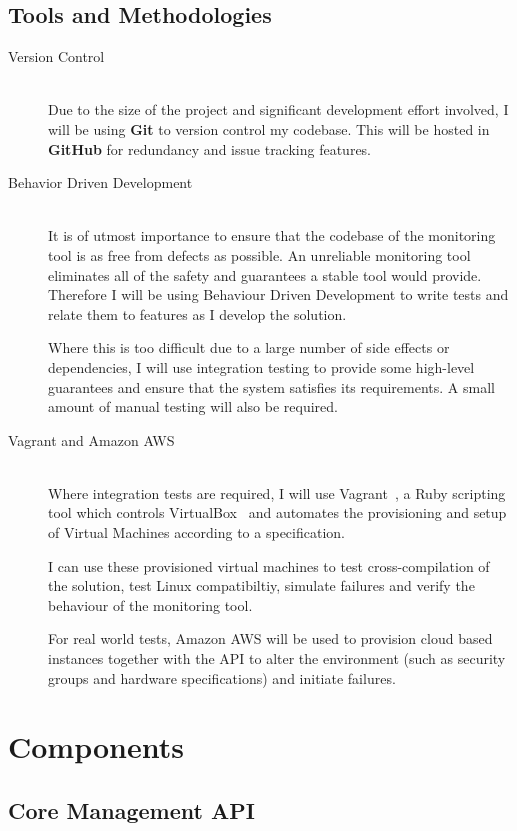 \documentclass{cshonours}
\begin{document}
\pagebreak
\subsection{Tools and Methodologies}
\begin{description}
  \item [Version Control]\hfill \\
    Due to the size of the project and significant development effort involved, I will be using \textbf{Git} to version control my codebase. This will be hosted in \textbf{GitHub} for redundancy and issue tracking features.
  \item [Behavior Driven Development]\hfill \\
    It is of utmost importance to ensure that the codebase of the monitoring tool is as free from defects as possible. An unreliable monitoring tool eliminates all of the safety and guarantees a stable tool would provide. Therefore I will be using Behaviour Driven Development to write tests and relate them to features as I develop the solution.

    Where this is too difficult due to a large number of side effects or dependencies, I will use integration testing to provide some high-level guarantees and ensure that the system satisfies its requirements. A small amount of manual testing will also be required.
  \item [Vagrant and Amazon AWS]\hfill \\
    Where integration tests are required, I will use Vagrant~\cite{Vagrant}, a Ruby scripting tool which controls VirtualBox~\cite{VirtualBox} and automates the provisioning and setup of Virtual Machines according to a specification.

    I can use these provisioned virtual machines to test cross-compilation of the solution, test Linux compatibiltiy, simulate failures and verify the behaviour of the monitoring tool.

    For real world tests, Amazon AWS will be used to provision cloud based instances together with the API to alter the environment (such as security groups and hardware specifications) and initiate failures.
\end{description}

\pagebreak
\section{Components}
\subsection{Core Management API}
\end{document}
